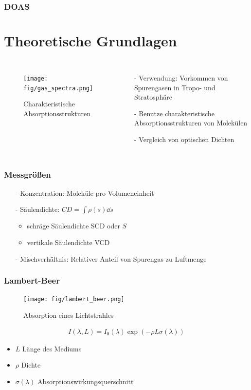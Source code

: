 \documentclass{beamer}
\begin{document}
\begin{frame}
    \frametitle{DOAS}
    \section{Theoretische Grundlagen}
    \begin{columns}

        \begin{figure}
        \texttt{[image: fig/gas\_spectra.png]}
        \caption{Charakteristische Absorptionsstrukturen \cite{atm_script}}
        \end{figure}
    
    \begin{itemize}
        \item[-] Verwendung: Vorkommen von Spurengasen in Tropo- und Stratosphäre
            \pause
        \item[-] Benutze charakteristische Absorptionsstrukturen von Molekülen
            \pause
        \item[-] Vergleich von optischen Dichten
    \end{itemize}
\end{columns}
\end{frame}

\begin{frame}
\frametitle{Messgrößen}
\begin{itemize}
    \item[-] Konzentration: Moleküle pro Volumeneinheit
        \pause
    \item[-] Säulendichte: $CD = \int \rho (s) \dd s$
        \begin{itemize}
            \item schräge Säulendichte SCD oder $S$
            \item vertikale Säulendichte VCD
        \end{itemize}
        \pause
    \item[-] Mischverhältnis: Relativer Anteil von Spurengas zu Luftmenge
    \end{itemize}
\end{frame}


\begin{frame}
    \frametitle{Lambert-Beer}
    \begin{figure}[h]
        \texttt{[image: fig/lambert\_beer.png]}
        \caption{Absorption eines Lichtstrahles}
    \end{figure}
    \begin{align}
    	I(\lambda, L) = I_0 (\lambda) \exp (- \rho  L \sigma (\lambda) )
    \end{align}
    \begin{itemize}
        \item $L$ Länge des Mediums
        \item $\rho$ Dichte
        \item $\sigma (\lambda)$ Absorptionswirkungsquerschnitt %
    \end{itemize}
\end{frame}
\end{document}
